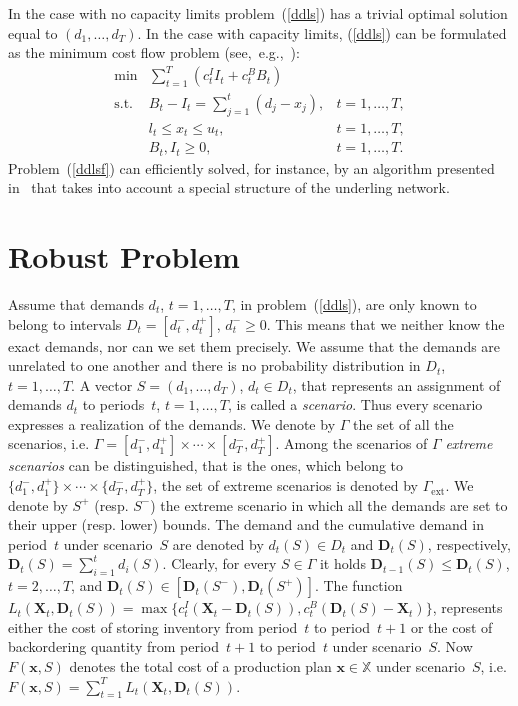 \documentclass[11pt]{article}
\newcommand{\Xset}{\mathbb{X}}
\begin{document}
In the case with no capacity limits problem~(\ref{ddls})
has a trivial optimal solution equal to $(d_1,\ldots,d_T)$.
In the case with capacity limits, (\ref{ddls}) can be formulated as
the minimum cost flow problem 
(see,~e.g.,~\cite{AMO93}):
\begin{equation}
 \begin{array}{lll}
 \min & \displaystyle\sum_{t=1}^{T}(c^I_t I_t+ c^B_t B_t)&\\
\text{s.t. } & B_t- I_t=\sum_{j=1}^{t}(d_j-x_j), & t=1,\ldots,T,\\
       &l_t\leq x_t\leq u_t,  &t=1,\ldots,T,\\
       &B_t,I_t\geq 0,  &t=1,\ldots,T.
 \end{array}
 \label{ddlsf}
\end{equation}
Problem~(\ref{ddlsf}) can  efficiently solved, for instance, by 
an algorithm presented in~\cite{AH08}
 that takes into account  a special structure of the underling network.

\section{Robust Problem}
\label{srob}
Assume that demands $d_t$, $t=1,\ldots,T$, in problem~(\ref{ddls}), are 
only known to belong to intervals $D_{t}=[d^{-}_{t},d^{+}_{t}]$,
$d^{-}_{t}\geq 0$.
This means that we neither know the exact 
demands, nor can we set them precisely. 
We assume that the demands are unrelated to one another
and there is no probability distribution in $D_t$, $t=1,\ldots,T$.
 A vector $S=(d_1,\ldots,d_T)$, $d_t\in D_t$, that represents an assignment of demands $d_t$ to periods~$t$, $t=1,\ldots,T$, is
called a \emph{scenario}. Thus every scenario
  expresses a realization of the demands.
We denote by $\Gamma$
   the set of all the scenarios, i.e. $\Gamma 
   =[d^{-}_{1},d^{+}_{1}]\times\cdots\times [d^{-}_{T},d^{+}_{T}]$.
   Among the scenarios of $\Gamma$
 \emph{extreme scenarios} can be distinguished,
 that is the ones, which belong to 
$\{d^{-}_{1},d^{+}_{1}\}\times\cdots\times \{d^{-}_{T},d^{+}_{T}\}$,
the set of extreme scenarios is denoted by $\Gamma_{\text{ext}}$.
We denote by $S^{+}$ (resp. $S^{-}$)
the extreme scenario in which all the demands
are set to their upper (resp. lower) bounds.
 The demand  and the cumulative demand in period~$t$ 
 under scenario~$S$ are denoted by 
 $d_t(S)\in D_t$ and $\mathbf{D}_t(S)$, respectively,
 $\mathbf{D}_t(S)=\sum_{i=1}^{t}d_i(S)$. Clearly, for every $S\in \Gamma$ it holds 
 $\mathbf{D}_{t-1}(S)\leq \mathbf{D}_t(S)$, $t=2,\ldots, T$, and
 $\mathbf{D}_t(S)\in [\mathbf{D}_t(S^{-}), \mathbf{D}_t(S^{+})]$.
 The function 
 $L_t(\mathbf{X}_t,\mathbf{D}_t(S))=
 \max\{c^{I}_t(\mathbf{X}_t-\mathbf{D}_t(S)),
c^{B}_t(\mathbf{D}_t(S)-\mathbf{X}_t)\}$,
 represents either the cost of storing inventory 
from period~$t$ to period~$t+1$
or  the cost of backordering quantity from period~$t+1$ to
period~$t$ under scenario~$S$.
Now $F(\pmb{x},S)$ denotes the total cost of 
a production plan $\pmb{x}\in \Xset$ under scenario~$S$, i.e.
$F(\pmb{x},S)=
\sum_{t=1}^{T}L_t(\mathbf{X}_t,\mathbf{D}_t(S))$.
\end{document}
